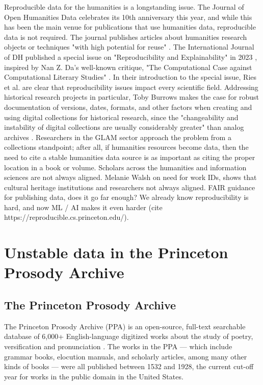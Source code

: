 \documentclass{anthology-ch}         %
\begin{document}
Reproducible data for the humanities is a longstanding issue. The Journal of Open Humanities Data celebrates its 10th anniversary this year, and while this has been the main venue for publications that use humanities data, reproducible data is not required. The journal publishes articles about humanities research objects or techniques "with high potential for reuse" \cite{noauthor_journal_2025}.  The International Journal of DH published a special issue on "Reproducibility and Explainability" in 2023 \cite{ries_reproducibility_2024}, inspired by Nan Z. Da's well-known critique, "The Computational Case against Computational Literary Studies" \cite{da_computational_2019}. In their introduction to the special issue, Ries et al. are clear that reproducibility issues impact every scientific field. Addressing historical research projects in particular, Toby Burrows makes the case for robust documentation of versions, dates, formats, and other factors when creating and using digital collections for historical research, since the "changeability and instability of digital collections are usually considerably greater" than analog archives \cite{burrows_reproducibility_2023}. Researchers in the GLAM sector approach the problem from a collections standpoint; after all, if humanities resources become data, then the need to cite a stable humanities data source is as important as citing the proper location in a book or volume. \cite{https://collectionsasdata.github.io/} Scholars across the humanities and information sciences are not always aligned. Melanie Walsh on need for work IDs, shows that cultural heritage institutions and researchers not always aligned. FAIR guidance for publishing data, does it go far enough? We already know reproducibility is hard, and now ML / AI makes it even harder (cite https://reproducible.cs.princeton.edu/). 

\section{Unstable data in the Princeton Prosody Archive}

\subsection{The Princeton Prosody Archive }

The Princeton Prosody Archive (PPA) is an open-source, full-text searchable database of 6,000+ English-language digitized works about the study of poetry, versification and pronunciation \cite{noauthor_princeton_nodate}. The works in the PPA — which include grammar books, elocution manuals, and scholarly articles, among many other kinds of books — were all published between 1532 and 1928, the current cut-off year for works in the public domain in the United States. 
\end{document}
